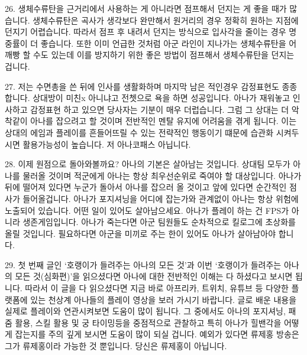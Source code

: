  



26. 생체수류탄을 근거리에서 사용하는 게 아니라면 점프해서 던지는 게 좋을 때가 많습니다. 생체수류탄은 곡사가 생각보다 완만해서 원거리의 경우 정확히 원하는 지점에 던지기 어렵습니다. 따라서 점프 후 내려서 던지는 방식으로 입사각을 줄이는 경우 명중률이 더 좋습니다. 또한 이미 언급한 것처럼 아군 라인이 지나가는 생체수류탄을 어깨빵 할 수도 있는데 이를 방지하기 위한 좋은 방법이 점프해서 생체수류탄을 던지는 겁니다.

 



27. 저는 수면총을 쓴 뒤에 인사를 생활화하며 마지막 남은 적인경우 감정표현도 종종 합니다. 상대방이 미친x 아니냐고 전쳇으로 욕을 하면 성공입니다. 아나가 재워놓고 인사하고 감정표현 하고 있으면 당사자는 기분이 매우 더럽습니다. 그럼 그 상대는 더 악착같이 아나를 잡으려고 할 것이며 전반적인 멘탈 유지에 어려움을 겪게 됩니다. 이는 상대의 에임과 플레이를 흔들어뜨릴 수 있는 전략적인 행동이기 떄문에 습관화 시켜두시면 활용가능성이 높습니다. 저 아나코패스 아닙니다.





28. 이제 원점으로 돌아와볼까요? 아나의 기본은 살아남는 것입니다. 상대팀 모두가 아나를 물러올 것이며 적군에게 아나는 항상 최우선순위로 죽여야 할 대상입니다. 아나가 뒤에 떨어져 있다면 누군가 돌아서 아나를 잡으러 올 것이고 앞에 있다면 순간적인 점사가 들어올겁니다. 아나가 포지셔닝을 어디에 잡는가와 관계없이 아나는 항상 위험에 노출되어 있습니다. 어떤 일이 있어도 살아남으세요. 아나가 플레이 하는 건 FPS가 아니라 생존게임입니다. 아나가 죽는다면 아군 팀원들도 순차적으로 킬로그에 초상화를 올릴 것입니다. 필요하다면 아군을 미끼로 주는 한이 있어도 아나가 살아남아야 합니다.

 

29. 첫 번째 글인 ‘호랭이가 들려주는 아나의 모든 것’과 이번 ‘호랭이가 들려주는 아나의 모든 것(심화편)’을 읽으셨다면 아나에 대한 전반적인 이해는 다 하셨다고 보시면 됩니다. 따라서 이 글을 다 읽으셨다면 지금 바로 아프리카, 트위치, 유튜브 등 다양한 플랫폼에 있는 천상계 아나들의 플레이 영상을 보러 가시기 바랍니다. 글로 배운 내용을 실제로 플레이와 연관시켜보면 도움이 많이 됩니다. 그 중에서도 아나의 포지셔닝, 패줌 활용, 스킬 활용 및 궁 타이밍등을 중점적으로 관찰하고 특히 아나가 힐밴각을 어떻게 잡는지를 주의 깊게 보시면 도움이 많이 되실 겁니다. 예외가 있다면 류제홍 방송은 그가 류제홍이라 가능한 것 뿐입니다. 당신은 류제홍이 아닙니다.